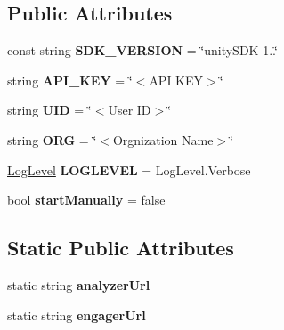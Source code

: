\subsection*{Public Attributes}
\begin{DoxyCompactItemize}
\item 
\hypertarget{class_omniata_s_d_k_1_1_omniata_aa3e7b8f3a3c2d478a47f7ae8a68c0cc4}{const string {\bfseries S\+D\+K\+\_\+\+V\+E\+R\+S\+I\+O\+N} = \char`\"{}unity\+S\+D\+K-\/1..\char`\"{}}\label{class_omniata_s_d_k_1_1_omniata_aa3e7b8f3a3c2d478a47f7ae8a68c0cc4}

\item 
\hypertarget{class_omniata_s_d_k_1_1_omniata_a8d1a041c5bbca524be7cc5ce5c8650b6}{string {\bfseries A\+P\+I\+\_\+\+K\+E\+Y} = \char`\"{}$<$A\+P\+I K\+E\+Y$>$\char`\"{}}\label{class_omniata_s_d_k_1_1_omniata_a8d1a041c5bbca524be7cc5ce5c8650b6}

\item 
\hypertarget{class_omniata_s_d_k_1_1_omniata_a19109de42d9461cbe4a470b27c4281db}{string {\bfseries U\+I\+D} = \char`\"{}$<$User I\+D$>$\char`\"{}}\label{class_omniata_s_d_k_1_1_omniata_a19109de42d9461cbe4a470b27c4281db}

\item 
\hypertarget{class_omniata_s_d_k_1_1_omniata_a96f8e9ba7a35eeef2c7dcc4a032a58be}{string {\bfseries O\+R\+G} = \char`\"{}$<$Orgnization Name$>$\char`\"{}}\label{class_omniata_s_d_k_1_1_omniata_a96f8e9ba7a35eeef2c7dcc4a032a58be}

\item 
\hypertarget{class_omniata_s_d_k_1_1_omniata_a7c9637f0f6bc4df125fb545ab43db57b}{\hyperlink{class_omniata_s_d_k_1_1_omniata_aac4ddf8e7386e787ff7ff8bab48cc6de}{Log\+Level} {\bfseries L\+O\+G\+L\+E\+V\+E\+L} = Log\+Level.\+Verbose}\label{class_omniata_s_d_k_1_1_omniata_a7c9637f0f6bc4df125fb545ab43db57b}

\item 
\hypertarget{class_omniata_s_d_k_1_1_omniata_aee56fadb72a6796661ce45d222ecdfa8}{bool {\bfseries start\+Manually} = false}\label{class_omniata_s_d_k_1_1_omniata_aee56fadb72a6796661ce45d222ecdfa8}

\end{DoxyCompactItemize}
\subsection*{Static Public Attributes}
\begin{DoxyCompactItemize}
\item 
\hypertarget{class_omniata_s_d_k_1_1_omniata_a92be8051c963115aa7a5fb9a437f3b1e}{static string {\bfseries analyzer\+Url}}\label{class_omniata_s_d_k_1_1_omniata_a92be8051c963115aa7a5fb9a437f3b1e}

\item 
\hypertarget{class_omniata_s_d_k_1_1_omniata_a61b82ad2cf26adbe576d7fb1ebc5e492}{static string {\bfseries engager\+Url}}\label{class_omniata_s_d_k_1_1_omniata_a61b82ad2cf26adbe576d7fb1ebc5e492}

\end{DoxyCompactItemize}
